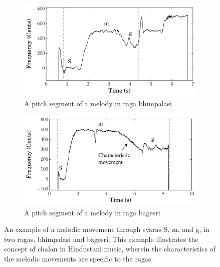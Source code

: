 \begin{figure}[h]

	\begin{subfigure}{\textwidth}
		\centering		
		\includegraphics[width=\figSizeSeventyFive]{ch02_background/figures/Bhimpalasi_S-m-g_Stereo.pdf}
		\caption{A pitch segment of a melody in \gls{raga} \gls{bhimpalasi}}
		\label{fig:chalan_bhimpalasi}
	\end{subfigure}
	\begin{subfigure}{\textwidth}
		\centering
		\includegraphics[width=\figSizeSeventyFive]{ch02_background/figures/Bageshri_S-m-g_Stereo.pdf}
		\caption{A pitch segment of a melody in \gls{raga} \gls{bagesri}}
		\label{fig:chalan_bageshri}
	\end{subfigure}
	\caption[An example of \gls{chalan} in Hindustani music]{An example of a melodic movement through \glspl{svara} S, m, and g, in two \glspl{raga}, \gls{bhimpalasi} and \gls{bagesri}. This example illustrates the concept of \gls{chalan} in Hindustani music, wherein the characteristics of the melodic movements are specific to the \glspl{raga}.}
	\label{fig:chalan_example}
\end{figure}

